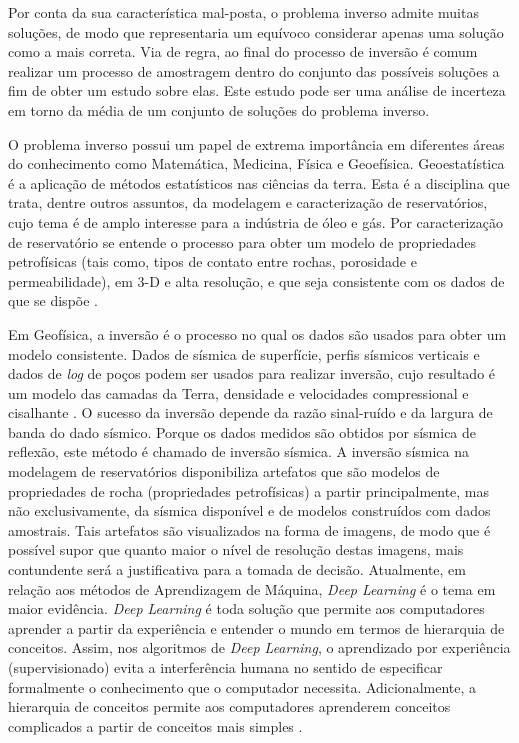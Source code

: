 Por conta da sua característica mal-posta, o problema inverso
admite muitas soluções, de modo que representaria um equívoco considerar apenas
uma solução como a mais correta. Via de regra, ao final do processo de inversão é comum
realizar um processo de amostragem dentro do conjunto das possíveis soluções a fim
de obter um estudo sobre elas. Este estudo pode ser uma análise de 
incerteza em torno da média de um conjunto de soluções do problema inverso.

O problema inverso possui um papel de extrema importância em diferentes áreas do conhecimento
como Matemática, Medicina, Física e Geoefísica. Geoestatística é a aplicação de métodos
estatísticos nas ciências da terra. Esta é a disciplina que trata, dentre outros assuntos, da modelagem
e caracterização de reservatórios, cujo tema é de amplo interesse para a indústria de óleo
e gás. Por caracterização de reservatório se entende o processo para obter um modelo de propriedades
petrofísicas (tais como, tipos de contato entre rochas, porosidade e permeabilidade),
em 3-D e alta resolução, e que seja consistente com os dados de que se dispõe \citep{deutsch2002}.

Em Geofísica, a inversão é o processo no qual os dados são usados para obter um modelo
consistente. Dados de sísmica de superfície, perfis sísmicos verticais e
dados de \textit{log} de poços podem ser usados para realizar inversão, cujo
resultado é um modelo das camadas da Terra, densidade e velocidades compressional
e cisalhante \citep{WinNT}. O sucesso da inversão depende da razão sinal-ruído e da
largura de banda do dado sísmico. Porque os dados medidos são obtidos por sísmica de reflexão,
este método é chamado de inversão sísmica. A inversão sísmica na
modelagem de reservatórios disponibiliza artefatos que são modelos de propriedades de rocha
(propriedades petrofísicas) a partir principalmente, mas não exclusivamente,
da sísmica disponível e de modelos construídos com dados amostrais. Tais artefatos
são visualizados na forma de imagens, de modo que é possível supor que quanto maior
o nível de resolução destas imagens, mais contundente será a justificativa para a tomada de decisão.
%
Atualmente, em relação aos métodos de Aprendizagem de Máquina, \textit{Deep Learning} é o tema em
maior evidência. \textit{Deep Learning} é toda solução que permite aos
computadores aprender a partir da experiência e entender o mundo em
termos de hierarquia de conceitos.
Assim, nos algoritmos de \textit{Deep Learning}, o aprendizado
por experiência (supervisionado) evita a interferência
humana no sentido de especificar formalmente o conhecimento que o computador necessita.
Adicionalmente, a hierarquia de conceitos permite aos computadores aprenderem
conceitos complicados a partir de conceitos mais simples \citep{Gdfl16}.

